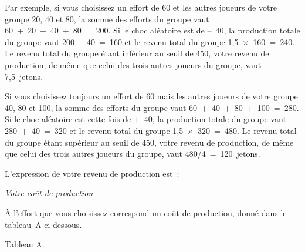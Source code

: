 \begin{Article}
\begin{refsection}[Lebourges]
\begin{appendices}
Par exemple, si vous choisissez un effort de 60 et les autres joueurs de
votre groupe 20, 40 et 80, la somme des efforts du groupe vaut
60~+~20~+~40~+~80~=~200. Si le choc aléatoire est de --~40, la
production totale du groupe vaut 200~--~40~=~160 et le revenu total du
groupe 1,5~×~160~=~240. Le revenu total du groupe étant inférieur au
seuil de 450, votre revenu de production, de même que celui des trois
autres joueurs du groupe, vaut 7,5~jetons.

Si vous choisissez toujours un effort de 60 mais les autres joueurs de
votre groupe 40, 80 et 100, la somme des efforts du groupe vaut
60~+~40~+~80~+~100~=~280. Si le choc aléatoire est cette fois de +~40,
la production totale du groupe vaut 280~+~40~=~320 et le revenu total du
groupe 1,5~×~320~=~480. Le revenu total du groupe étant supérieur au
seuil de 450, votre revenu de production, de même que celui des trois
autres joueurs du groupe, vaut 480/4~=~120~jetons.

L'expression de votre revenu de production est~:

\begin{center}
\noindent{}
\end{center}

\emph{Votre coût de production}

\vspace{0,2cm}
À l'effort que vous choisissez correspond un coût de production, donné
dans le tableau~A ci-dessous.

\vspace{0,2cm}
{\centering Tableau A.\par}


\end{appendices}
\end{refsection}
\end{Article}
